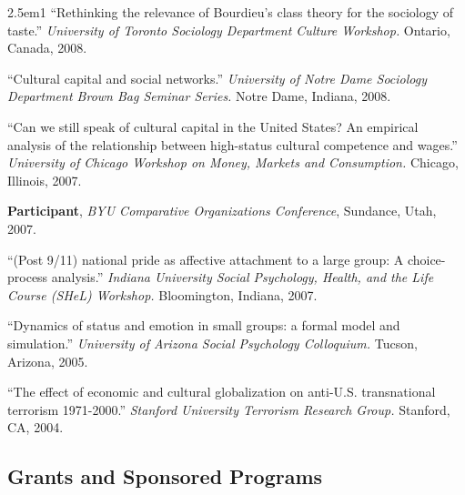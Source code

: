\documentclass[
]{article}
\newenvironment{cventry}{\begin{hangparas}{2.5em}{1}}{\end{hangparas}}
\begin{document}
\begin{cventry}
``Rethinking the relevance of Bourdieu's class theory for the sociology
of taste.'' \emph{University of Toronto Sociology Department Culture
Workshop.} Ontario, Canada, 2008.

``Cultural capital and social networks.'' \emph{University of Notre Dame
Sociology Department Brown Bag Seminar Series.} Notre Dame, Indiana,
2008.

``Can we still speak of cultural capital in the United States? An
empirical analysis of the relationship between high-status cultural
competence and wages.'' \emph{University of Chicago Workshop on Money,
Markets and Consumption.} Chicago, Illinois, 2007.

\textbf{Participant}, \emph{BYU Comparative Organizations Conference},
Sundance, Utah, 2007.

``(Post 9/11) national pride as affective attachment to a large group: A
choice-process analysis.'' \emph{Indiana University Social Psychology,
Health, and the Life Course (SHeL) Workshop.} Bloomington, Indiana,
2007.

``Dynamics of status and emotion in small groups: a formal model and
simulation.'' \emph{University of Arizona Social Psychology Colloquium.}
Tucson, Arizona, 2005.

``The effect of economic and cultural globalization on anti-U.S.
transnational terrorism 1971-2000.'' \emph{Stanford University Terrorism
Research Group.} Stanford, CA, 2004.

\end{cventry}

\subsection{Grants and Sponsored
Programs}\label{grants-and-sponsored-programs}
\end{document}
